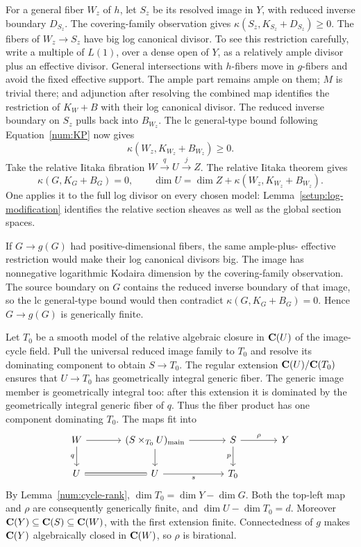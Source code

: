 For a general fiber $W_z$ of $h$, let $S_z$ be its resolved image
in $Y$, with reduced inverse boundary $D_{S_z}$. The covering-family
observation gives $\kappa(S_z,K_{S_z}+D_{S_z})\geq0$.
The fibers of $W_z\to S_z$ have big log canonical divisor.  To see
this restriction carefully, write a multiple of $L(1)$, over a
dense open of $Y$, as a relatively ample divisor plus an effective
divisor.  General intersections with $h$-fibers move in $g$-fibers
and avoid the fixed effective support.  The ample part remains ample
on them; $M$ is trivial there; and adjunction after resolving the
combined map identifies the restriction of $K_W+B$ with their log
canonical divisor. The reduced inverse boundary on $S_z$ pulls back
into $B_{W_z}$. The lc general-type bound following
Equation~\eqref{num:KP} now gives
\[
 \kappa(W_z,K_{W_z}+B_{W_z})\geq0.
\]
Take the relative Iitaka fibration $W\xrightarrow qU\xrightarrow jZ$.
The relative Iitaka theorem \cite[Section~6, Remark~1]{IitakaOriginal} gives
\begin{equation}\label{num:iitaka-dimension}
 \kappa(G,K_G+B_G)=0,
 \qquad\dim U=\dim Z+\kappa(W_z,K_{W_z}+B_{W_z}).
\end{equation}
One applies it to the full log divisor on every chosen model:
Lemma~\ref{setup:log-modification} identifies the relative section
sheaves as well as the global section spaces.

If $G\to g(G)$ had positive-dimensional fibers, the same ample-plus-
effective restriction would make their log canonical divisors big.
The image has nonnegative logarithmic Kodaira dimension by the covering-family
observation. The source boundary on $G$ contains the reduced inverse
boundary of that image, so the lc general-type bound would then contradict
$\kappa(G,K_G+B_G)=0$.  Hence $G\to g(G)$ is generically finite.

Let $T_0$ be a smooth model of the relative algebraic closure in
$\mathbf C(U)$ of the image-cycle field.  Pull the universal reduced image
family to $T_0$ and resolve its dominating component to obtain
$S\to T_0$.  The regular extension $\mathbf C(U)/\mathbf C(T_0)$ ensures that
$U\to T_0$ has geometrically integral generic fiber.  The generic
image member is geometrically integral too: after this extension it
is dominated by the geometrically integral generic fiber of $q$.
Thus the fiber product has one component dominating $T_0$.  The maps
fit into
\begin{equation}\label{num:product}
\begin{tikzcd}[column sep=large]
 W\arrow[r]\arrow[d,"q"']&
 (S\times_{T_0}U)_{\mathrm{main}}\arrow[r]\arrow[d]&
 S\arrow[r,"\rho"]\arrow[d,"p"']&Y\\
 U\arrow[r,equal]&U\arrow[r,"s"']&T_0&
\end{tikzcd}
\end{equation}
By Lemma~\ref{num:cycle-rank}, $\dim T_0=\dim Y-\dim G$.
Both the top-left map and $\rho$ are consequently generically finite,
and $\dim U-\dim T_0=d$.  Moreover
$\mathbf C(Y)\subseteq\mathbf C(S)\subseteq\mathbf C(W)$, with the first extension
finite.  Connectedness of $g$ makes $\mathbf C(Y)$ algebraically closed in
$\mathbf C(W)$, so $\rho$ is birational.

